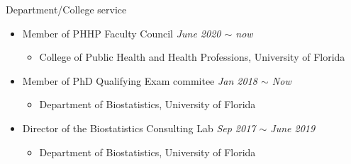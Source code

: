 \documentclass{resume} %
\begin{document}
\begin{rSection}{Department/College service}
\begin{itemize}[noitemsep,topsep=0pt]

\item Member of PHHP Faculty Council
        \hfill {\em June 2020 $\sim$ now} 
        \begin{itemize}
        \item College of Public Health and Health Professions, University of Florida
        \end{itemize}

\item Member of PhD Qualifying Exam commitee 
        \hfill {\em Jan 2018 $\sim$ Now} 
        \begin{itemize}
        \item Department of Biostatistics, University of Florida
        \end{itemize}

\item Director of the Biostatistics Consulting Lab
        \hfill {\em Sep 2017 $\sim$ June 2019} 
        \begin{itemize}
        \item Department of Biostatistics, University of Florida
        \end{itemize}


\end{itemize}
\end{rSection}
\end{document}
